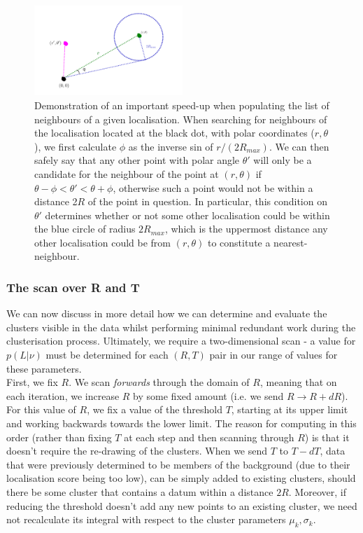 \documentclass[11pt]{article}
\begin{document}
\begin{figure}
\centering
\includegraphics[width=0.5\textwidth]{figs/dphi.png}
\caption{Demonstration of an important speed-up when populating the list of neighbours of a given localisation. When searching for neighbours of the localisation located at the black dot, with polar coordinates ($r,\theta$), we first calculate $\phi$ as the inverse sin of $r / (2R_{max})$. We can then safely say that any other point with polar angle $\theta'$ will only be a candidate for the neighbour of the point at $(r,\theta)$ if $\theta - \phi < \theta' < \theta + \phi$, otherwise such a point would not be within a distance 2$R$ of the point in question. In particular, this condition on $\theta'$ determines whether or not some other localisation could be within the blue circle of radius $2R_{max}$, which is the uppermost distance any other localisation could be from $(r,\theta)$ to constitute a nearest-neighbour.  }
\label{dphi}
\end{figure}

\subsubsection{The scan over R and T}
\label{RTScan}


We can now discuss in more detail how we can determine and evaluate the clusters visible in the data whilst performing minimal redundant work during the clusterisation process. Ultimately, we require a two-dimensional scan - a value for $p(L | \nu)$ must be determined for each $(R,T)$ pair in our range of values for these parameters. \\

First, we fix $R$. We scan \textit{forwards} through the domain of $R$, meaning that on each iteration, we increase $R$ by some fixed amount (i.e. we send $R \rightarrow R + dR$). For this value of $R$, we fix a value of the threshold $T$, starting at its upper limit and working backwards towards the lower limit. The reason for computing in this order (rather than fixing $T$ at each step and then scanning through $R$) is that it doesn't require the re-drawing of the clusters. When we send $T$ to $T - dT$, data that were previously determined to be members of the background (due to their localisation score being too low), can be simply added to existing clusters, should there be some cluster that contains a datum within a distance $2R$. Moreover, if reducing the threshold doesn't add any new points to an existing cluster, we need not recalculate its integral with respect to the cluster parameters $\mu_k, \sigma_k$.
\end{document}
